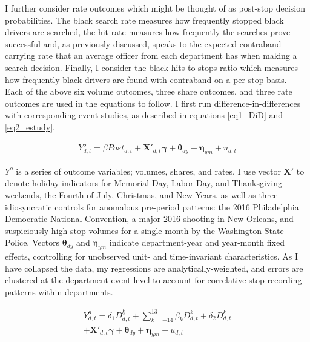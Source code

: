 I further consider rate outcomes which might be thought of as post-stop decision probabilities. The black search rate measures how frequently stopped black drivers are searched, the hit rate measures how frequently the searches prove successful and, as previously discussed, speaks to the expected contraband carrying rate that an average officer from each department has when making a search decision. Finally, I consider the black hits-to-stops ratio which measures how frequently black drivers are found with contraband on a per-stop basis. \\

Each of the above six volume outcomes, three share outcomes, and three rate outcomes are used in the equations to follow. I first run difference-in-differences with corresponding event studies, as described in equations \ref{eq1_DiD} and \ref{eq2_estudy}. 

\begin{center}
	
\end{center}

\begin{equation}
	\begin{split}
		Y^{o}_{d,t} = \beta Post_{d,t} + \boldsymbol{X'}_{d,t} \boldsymbol{\gamma} + \boldsymbol{\theta}_{dy} + \boldsymbol{\eta}_{ym} + u_{d,t} 
    		\label{eq1_DiD}
	\end{split}
\end{equation}

$Y^{o}$ is a series of outcome variables; volumes, shares, and rates. I use vector $\boldsymbol{X'}$ to denote holiday indicators for Memorial Day, Labor Day, and Thanksgiving weekends, the Fourth of July, Christmas, and New Years, as well as three idiosyncratic controls for anomalous pre-period patterns: the 2016 Philadelphia Democratic National Convention, a major 2016 shooting in New Orleans, and suspiciously-high stop volumes for a single month by the Washington State Police. Vectors $\boldsymbol{\theta}_{dy}$ and $\boldsymbol{\eta}_{ym}$ indicate department-year and year-month fixed effects, controlling for unobserved unit- and time-invariant characteristics. As I have collapsed the data, my regressions are analytically-weighted, and errors are clustered at the department-event level to account for correlative stop recording patterns within departments. 

\begin{equation}
	\begin{split}
		Y^{o}_{d,t} = \delta_{1} D^{\underline{k}}_{d,t} + \sum^{13}_{k=-14} \beta_{k}D^{k}_{d,t} + \delta_{2} D^{\bar{k}}_{d,t} \\ 
			+ \boldsymbol{X'}_{d,t} \boldsymbol{\gamma} + \boldsymbol{\theta}_{dy} + \boldsymbol{\eta}_{ym} + u_{d,t}
		\label{eq2_estudy}
	\end{split}
\end{equation}


